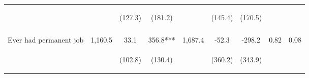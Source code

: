 \begin{table}[h!]
{\begin{tabular}{lcccccccc}
 & \begin{footnotesize}\end{footnotesize} & \begin{footnotesize}(127.3)\end{footnotesize} & \begin{footnotesize}(181.2)\end{footnotesize} & \begin{footnotesize}\end{footnotesize} & \begin{footnotesize}(145.4)\end{footnotesize} & \begin{footnotesize}(170.5)\end{footnotesize} & \begin{footnotesize}\end{footnotesize} & \begin{footnotesize}\end{footnotesize}\\
 & \begin{footnotesize}\end{footnotesize} & \begin{footnotesize}[1.000]\end{footnotesize} & \begin{footnotesize}[0.045]\end{footnotesize} & \begin{footnotesize}\end{footnotesize} & \begin{footnotesize}[1.000]\end{footnotesize} & \begin{footnotesize}[0.479]\end{footnotesize} & \begin{footnotesize}\end{footnotesize} & \begin{footnotesize}\end{footnotesize}\\
\noalign{\smallskip}Ever had permanent job & 1,160.5 & 33.1 & 356.8*** & 1,687.4 & -52.3 & -298.2 & 0.82 & 0.08\\
 & \begin{footnotesize}\end{footnotesize} & \begin{footnotesize}(102.8)\end{footnotesize} & \begin{footnotesize}(130.4)\end{footnotesize} & \begin{footnotesize}\end{footnotesize} & \begin{footnotesize}(360.2)\end{footnotesize} & \begin{footnotesize}(343.9)\end{footnotesize} & \begin{footnotesize}\end{footnotesize} & \begin{footnotesize}\end{footnotesize}\\

\end{tabular}}
\end{table}
